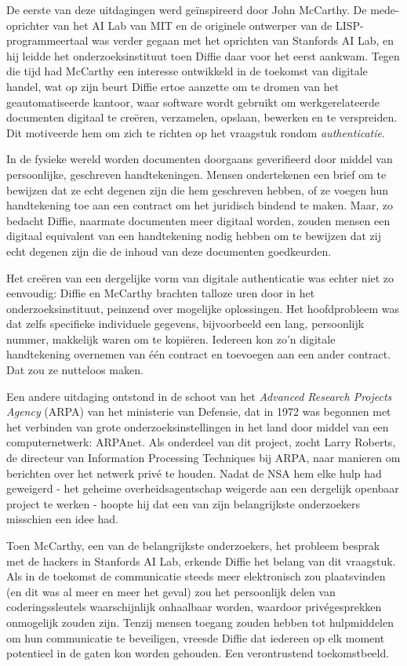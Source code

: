 \documentclass[
  a5paper,
  smalldemyvopaper,11pt,twoside,onecolumn,openright,extrafontsizes,
hidelinks]{memoir}
\begin{document}
De eerste van deze uitdagingen werd geïnspireerd door John McCarthy. De
mede-oprichter van het AI Lab van MIT en de originele ontwerper van de
LISP-programmeertaal was verder gegaan met het oprichten van Stanfords
AI Lab, en hij leidde het onderzoeksinstituut toen Diffie daar voor het
eerst aankwam. Tegen die tijd had McCarthy een interesse ontwikkeld in
de toekomst van digitale handel, wat op zijn beurt Diffie ertoe aanzette
om te dromen van het geautomatiseerde kantoor, waar software wordt
gebruikt om werkgerelateerde documenten digitaal te creëren, verzamelen,
opslaan, bewerken en te verspreiden. Dit motiveerde hem om zich te
richten op het vraagstuk rondom \emph{authenticatie}.

In de fysieke wereld worden documenten doorgaans geverifieerd door
middel van persoonlijke, geschreven handtekeningen. Mensen ondertekenen
een brief om te bewijzen dat ze echt degenen zijn die hem geschreven
hebben, of ze voegen hun handtekening toe aan een contract om het
juridisch bindend te maken. Maar, zo bedacht Diffie, naarmate documenten
meer digitaal worden, zouden mensen een digitaal equivalent van een
handtekening nodig hebben om te bewijzen dat zij echt degenen zijn die
de inhoud van deze documenten goedkeurden.

Het creëren van een dergelijke vorm van digitale authenticatie was
echter niet zo eenvoudig: Diffie en McCarthy brachten talloze uren door
in het onderzoeksinstituut, peinzend over mogelijke oplossingen. Het
hoofdprobleem was dat zelfs specifieke individuele gegevens,
bijvoorbeeld een lang, persoonlijk nummer, makkelijk waren om te
kopiëren. Iedereen kon zo'n digitale handtekening overnemen van één
contract en toevoegen aan een ander contract. Dat zou ze nutteloos
maken.

Een andere uitdaging ontstond in de schoot van het \emph{Advanced
Research Projects Agency} (ARPA) van het ministerie van Defensie, dat in
1972 was begonnen met het verbinden van grote onderzoeksinstellingen in
het land door middel van een computernetwerk: ARPAnet. Als onderdeel van
dit project, zocht Larry Roberts, de directeur van Information
Processing Techniques bij ARPA, naar manieren om berichten over het
netwerk privé te houden. Nadat de NSA hem elke hulp had geweigerd - het
geheime overheidsagentschap weigerde aan een dergelijk openbaar project
te werken - hoopte hij dat een van zijn belangrijkste onderzoekers
misschien een idee had.

Toen McCarthy, een van de belangrijkste onderzoekers, het probleem
besprak met de hackers in Stanfords AI Lab, erkende Diffie het belang
van dit vraagstuk. Als in de toekomst de communicatie steeds meer
elektronisch zou plaatsvinden (en dit was al meer en meer het geval) zou
het persoonlijk delen van coderingssleutels waarschijnlijk onhaalbaar
worden, waardoor privégesprekken onmogelijk zouden zijn. Tenzij mensen
toegang zouden hebben tot hulpmiddelen om hun communicatie te
beveiligen, vreesde Diffie dat iedereen op elk moment potentieel in de
gaten kon worden gehouden. Een verontrustend toekomstbeeld.
\end{document}
